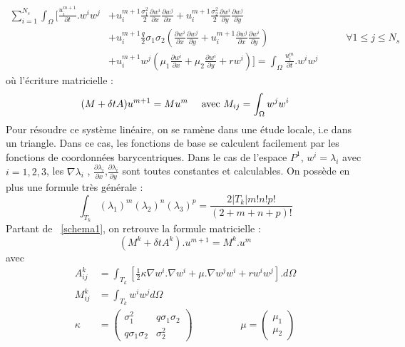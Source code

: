 \documentclass{book}
\begin{document}
\begin{equation}
\label{schema1}
\begin{split}
 \sum_{i=1}^{N_{s}} \int_\Omega[\frac{u_{i}^{m+1}}{\partial t}.w^{i}w^{j} 
 &+ u_{i}^{m+1}\frac{\sigma_1^2}2\frac{\partial w^{i}}{\partial x}\frac{\partial w^{j}}{\partial x}
  + u_{i}^{m+1}\frac{\sigma_2^2}2\frac{\partial w^{i}}{\partial y}\frac{\partial w^{j}}{\partial y}\\
 &+ u_{i}^{m+1}\frac{q}{2}\sigma_1\sigma_2(\frac{\partial w^{i}}{\partial x}\frac{\partial w^{j}}{\partial y}
  + u_{i}^{m+1}\frac{\partial w^{j}} {\partial x}\frac{\partial w^{i}}{\partial y})\\
 &+ u_{i}^{m+1}w^{j}(\mu_1\frac{\partial w^{i}}{\partial x}+\mu_2\frac{\partial w^{i}}{\partial y} +r w^{i})] 
  = \int_\Omega \frac{u_{i}^{m}}{\partial t}.w^{i}w^{j}
\end{split}
\hspace{1cm}
\forall 1 \leq j \leq N_s
\end{equation}
où l'écriture matricielle :
\[(M+ \delta t A) u^{m+1} = M u^m~~~\hbox{ avec } M_{ij}=\int_\Omega w^{j} w^{i}\]
Pour résoudre ce système linéaire, on se ramène dans une étude locale, i.e dans un triangle. Dans ce cas, les fonctions de base se calculent facilement par les fonctions de coordonnées barycentriques. Dans le cas de l'espace $P^1$, $w^i= \lambda_i$ avec $i=1,2,3$, les $\nabla \lambda_i$ , $\frac{\partial \lambda_i}{\partial x}$,$\frac{\partial \lambda_i}{\partial y}$ sont toutes constantes et calculables. On possède en plus une formule très générale :
\[
 \int_{T_k} (\lambda_1)^m(\lambda_2)^n(\lambda_3)^p=\frac{2|T_k|m!n!p!}{(2+m+n+p)!}
\]
Partant de ~\eqref{schema1}, on retrouve la formule matricielle :
\[  (M^k + \delta t A^k).u^{m+1} = M^k.u^m  \]
avec
\begin{equation}
\label{schema2D-matriciel}
\begin{split}
A_{ij}^k &=\int_{T_k}[\frac{1}{2}\kappa\nabla w^i.\nabla w^i +\mu.\nabla w^j w^i+ rw^i w^j].d\Omega \\
M_{ij}^k &=\int_{T_k} w^i w^j d\Omega \\
\kappa   &=\left(\begin{array}{cc}
		 \sigma_{1}^{2} & q\sigma_{1}\sigma_{2}\\
		 q\sigma_{1}\sigma_{2} & \sigma_{2}^{2}
		 \end{array}\right)
\hspace{2cm} 
\mu=\left(\begin{array}{c}
	   \mu_{1}\\
	   \mu_{2}
	  \end{array}\right)
\end{split}
\end{equation}
\end{document}
